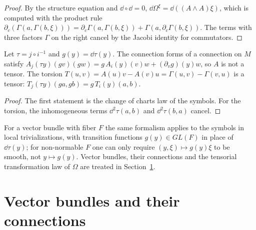\begin{proof}
  \leanok
  By the structure equation and $\dd \circ \dd = 0$, $\dd\Omega^\xi = \dd((A \wedge A)\xi)$, which
  is computed with the product rule
  $\partial_c(\Gamma(a, \Gamma(b, \xi))) = \partial_c\Gamma(a, \Gamma(b, \xi)) + \Gamma(a,
  \partial_c\Gamma(b, \xi))$. The terms with three factors $\Gamma$ on the right cancel by the
  Jacobi identity for commutators.
\end{proof}

\begin{proposition}
  \label{prop:gauge}
  \leanok
  Let $\tau = j \circ i^{-1}$ and $g(y) = \dd\tau(y)$. The connection forms of a connection on
  $M$ satisfy $A_j(\tau y)(g v)(g w) = g\,A_i(y)(v) w + (\partial_v g)(y) w$, so $A$ is not a
  tensor. The torsion $T(u, v) = A(u)v - A(v)u = \Gamma(u, v) - \Gamma(v, u)$ is a tensor:
  $T_j(\tau y)(g a, g b) = g\, T_i(y)(a, b)$.
\end{proposition}

\begin{proof}
  \leanok
  The first statement is the change of charts law of the symbols. For the torsion, the
  inhomogeneous terms $\dd^2\tau(a, b)$ and $\dd^2\tau(b, a)$ cancel.
\end{proof}

\begin{remark}
  For a vector bundle with fiber $F$ the same formalism applies to the symbols in local
  trivializations, with transition functions $g(y) \in GL(F)$ in place of $\dd\tau(y)$; for
  non-normable $F$ one can only require $(y, \xi) \mapsto g(y)\xi$ to be smooth, not
  $y \mapsto g(y)$. Vector bundles, their connections and the tensorial transformation law of
  $\Omega$ are treated in Section~\ref{sec:vector-bundles}.
\end{remark}

\section{Vector bundles and their connections}
\label{sec:vector-bundles}

